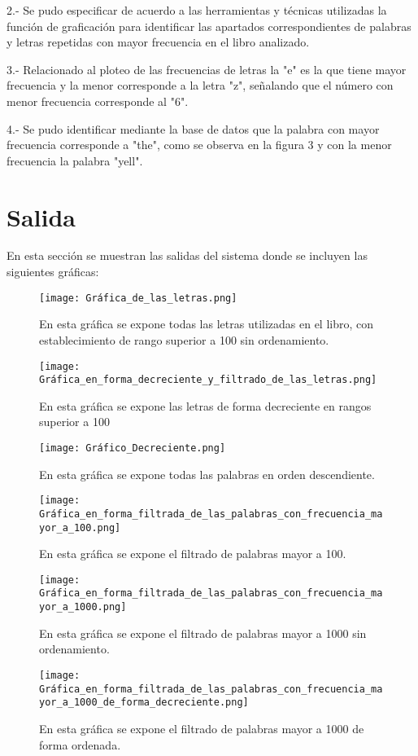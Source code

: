 \documentclass{article}
\begin{document}
2.- Se pudo especificar de acuerdo a las herramientas y técnicas utilizadas la función de graficación para identificar las apartados correspondientes de palabras y letras repetidas con mayor frecuencia en el libro analizado.

3.- Relacionado al ploteo de las frecuencias de letras la "e" es la que tiene mayor frecuencia y la menor corresponde a la letra "z", señalando que el número con menor frecuencia corresponde al "6".

4.- Se pudo identificar mediante la base de datos que la palabra con mayor frecuencia corresponde a "the", como se observa en la figura 3  y con la menor frecuencia  la palabra "yell".


\section{Salida}
En esta sección se muestran las salidas del sistema donde se incluyen las siguientes gráficas:
\begin{figure}[ht]
    \texttt{[image: Gráfica\_de\_las\_letras.png]}
    \caption{En esta gráfica se expone todas las letras utilizadas en el libro, con establecimiento de rango superior a 100 sin ordenamiento.}
    \label{fig:letras}
\end{figure}
\begin{figure}[ht]
    \centering
    \texttt{[image: Gráfica\_en\_forma\_decreciente\_y\_filtrado\_de\_las\_letras.png]}
    \caption{En esta gráfica se expone las letras de forma decreciente en rangos superior a 100 }
    \label{fig:Letras_filtradas}
\end{figure}
\begin{figure}[ht]
    \centering
    \texttt{[image: Gráfico\_Decreciente.png]}
    \caption{En esta gráfica se expone todas las palabras en orden descendiente.}
    \label{fig:Palabras}
\end{figure}
\begin{figure}[ht]
    \centering
    \texttt{[image: Gráfica\_en\_forma\_filtrada\_de\_las\_palabras\_con\_frecuencia\_mayor\_a\_100.png]}
    \caption{ En esta gráfica se expone el filtrado de palabras mayor a 100.}
    \label{fig:Palabras}
\end{figure}
\begin{figure}[ht]
    \centering
    \texttt{[image: Gráfica\_en\_forma\_filtrada\_de\_las\_palabras\_con\_frecuencia\_mayor\_a\_1000.png]}
    \caption{En esta gráfica se expone el filtrado de palabras mayor a 1000 sin ordenamiento.}
    \label{fig:Palabras}
\end{figure}
\begin{figure}[ht]
    \centering
    \texttt{[image: Gráfica\_en\_forma\_filtrada\_de\_las\_palabras\_con\_frecuencia\_mayor\_a\_1000\_de\_forma\_decreciente.png]}
    \caption{En esta gráfica se expone el filtrado de palabras mayor a 1000 de forma ordenada.}
    \label{fig:Palabras}
\end{figure}


\clearpage


\end{document}
